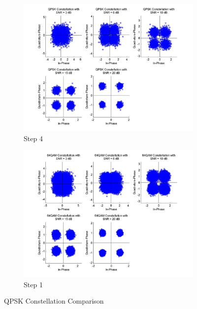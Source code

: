 \documentclass[]{article}
\begin{document}
\newpage
\begin{figure}[h]
        \centering
        \begin{subfigure}[b]{0.6\textwidth}
                \includegraphics[width=\textwidth]{qpConst.jpg}
                \caption{Step 4}
                \label{fig:qpConst}
        \end{subfigure}%
        \qquad \quad %
        \begin{subfigure}[b]{0.6\textwidth}
                \includegraphics[width=\textwidth]{qpConst1.jpg}
                \caption{Step 1}
                \label{fig:qpConst1}
        \end{subfigure}
        \caption{QPSK Constellation Comparison }
\end{figure}
\end{document}
